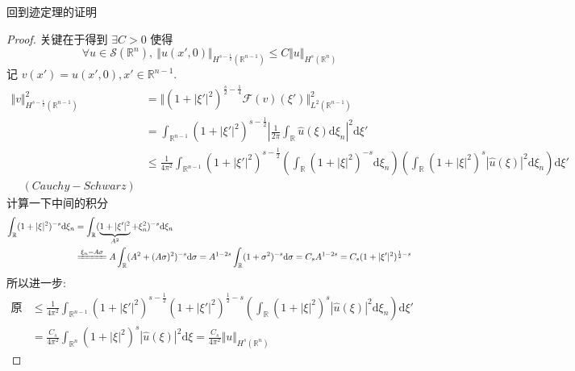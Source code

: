 \documentclass[11pt]{ctexart}[UTF8]
\begin{document}
回到迹定理的证明
\begin{proof}
    关键在于得到 $\exists C > 0$ 使得
    \begin{equation*}
        \forall u \in \mathscr{S}(\mathbb{R}^n),\ \Vert u(x', 0) \Vert_{H^{s-\frac{1}{2}}(\mathbb{R}^{n-1})} \leq C\Vert u \Vert_{H^{s}(\mathbb{R}^n)}
    \end{equation*}
    记 $v(x') = u(x', 0), x' \in \mathbb{R}^{n-1}$.
    \begin{equation*}
        \begin{aligned}
            \Vert v \Vert_{H^{s-\frac{1}{2}}(\mathbb{R}^{n-1})}^2 &= \Vert (1+|\xi'|^2)^{\frac{s}{2}-\frac{1}{4}}\mathcal{F}(v)(\xi') \Vert_{L^{2}(\mathbb{R}^{n-1})}^2\\
            &= \int_{\mathbb{R}^{n-1}} (1+|\xi'|^2)^{s-\frac{1}{2}} \left| \frac{1}{2\pi}\int_{\mathbb{R}} \widehat{u}(\xi)\mathrm{d}\xi_{n} \right|^2 \mathrm{d}\xi'\\
            &\leq\frac{1}{4\pi^2} \int_{\mathbb{R}^{n-1}} (1+|\xi'|^2)^{s-\frac{1}{2}}\left( \int_{\mathbb{R}} (1+|\xi|^2)^{-s} \mathrm{d}\xi_{n} \right) \left( \int_{\mathbb{R}} (1+|\xi|^2)^{s} |\widehat{u}(\xi)|^2 \mathrm{d}\xi_{n} \right) \mathrm{d}\xi'\\ \quad (Cauchy-Schwarz)
        \end{aligned}
    \end{equation*}
    计算一下中间的积分
    \begin{equation*}
        \begin{aligned}
            \int_{\mathbb{R}} (1+|\xi|^2)^{-s} \mathrm{d}\xi_{n} &= \int_{\mathbb{R}} (\underbrace{1+|\xi'|^2}_{A^2} + \xi_{n}^2)^{-s} \mathrm{d}\xi_{n} \\
            &\xlongequal{\xi_{n} = A\sigma} A \int_{\mathbb{R}} (A^2 + (A\sigma)^2)^{-s} \mathrm{d}\sigma = A^{1-2s} \int_{\mathbb{R}} (1+\sigma^2)^{-s} \mathrm{d}\sigma = C_{s}A^{1-2s} = C_{s}(1+|\xi'|^2)^{\frac{1}{2}-s}
        \end{aligned}
    \end{equation*}
    所以进一步:
    \begin{equation*}
        \begin{aligned}
            \text{原估计} &\leq \frac{1}{4\pi^2}\int_{\mathbb{R}^{n-1}} (1+|\xi'|^2)^{s-\frac{1}{2}}(1+|\xi'|^2)^{\frac{1}{2}-s} \left( \int_{\mathbb{R}} (1+|\xi|^2)^{s} |\widehat{u}(\xi)|^2 \mathrm{d}\xi_{n} \right) \mathrm{d}\xi'\\
            &= \frac{C_{s}}{4\pi^2} \int_{\mathbb{R}^n} (1+|\xi|^2)^{s} |\widehat{u}(\xi)|^2 \mathrm{d}\xi = \frac{C_{s}}{4\pi^2}\Vert u \Vert_{H^{s}(\mathbb{R}^n)}

\end{aligned}
\end{equation*}
\end{proof}
\end{document}
